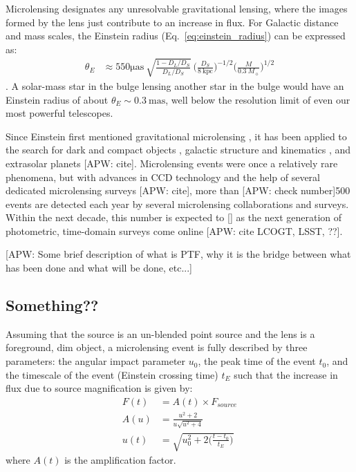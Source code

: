 \documentclass[12pt,preprint]{aastex}
\begin{document}
Microlensing designates any unresolvable gravitational lensing, where the images formed by the lens just contribute to an increase in flux. For Galactic distance and mass scales, the Einstein radius (Eq.~\ref{eq:einstein_radius}) can be expressed as:
\begin{align}
	\theta_E &\approx 550\mathrm{\mu as}~\sqrt{\frac{1-D_L/D_S}{D_L/D_S}}~\Big(\frac{D_S}{8~\mathrm{kpc}}\Big)^{-1/2} \Big(\frac{M}{0.3~M_\sun}\Big)^{1/2}
\end{align}
\citep{paczynski1986, gaudi2011}. A solar-mass star in the bulge lensing another star in the bulge would have an Einstein radius of about $\theta_E \sim 0.3~\mathrm{mas}$, well below the resolution limit of even our most powerful telescopes.

Since Einstein first mentioned gravitational microlensing \citep{einstein1936}, it has been applied to the search for dark and compact objects \citep{original_macho, oslowski2008, sartore2010}, galactic structure and kinematics \citep{binney2000}, and extrasolar planets \citep{}[APW: cite]. Microlensing events were once a relatively rare phenomena, but with advances in CCD technology and the help of several dedicated microlensing surveys [APW: cite], more than [APW: check number]500 events are detected each year by several microlensing collaborations and surveys. Within the next decade, this number is expected to [] as the next generation of photometric, time-domain surveys come online [APW: cite LCOGT, LSST, ??].

[APW: Some brief description of what is PTF, why it is the bridge between what has been done and what will be done, etc...]

\subsection{Something??}
Assuming that the source is an un-blended point source and the lens is a foreground, dim object, a microlensing event is fully described by three parameters: the angular impact parameter $u_0$, the peak time of the event $t_0$, and the timescale of the event (Einstein crossing time) $t_E$ such that the increase in flux due to source magnification is given by:
\begin{align}
	F(t) &= A(t)\times F_{source} \\
	A(u) &= \frac{u^2 + 2}{u\sqrt{u^2 + 4}}\\
	u(t) &= \sqrt{u_0^2 + 2\Big(\frac{t-t_0}{t_E}\Big)}
\end{align}
where $A(t)$ is the amplification factor.
\end{document}
